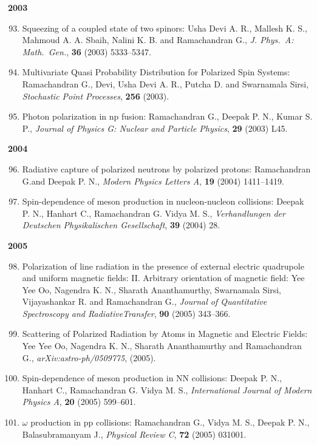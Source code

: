 \textbf{2003}
\begin{enumerate}
\setcounter{enumi}{92}
\item Squeezing of a coupled state of two spinors: Usha Devi A. R., Mallesh K. S., Mahmoud A. A. Sbaih, Nalini K. B. and Ramachandran G., \textit{J. Phys.\ A: Math.\ Gen.}, {\bf 36} (2003) 5333--5347.
\item Multivariate Quasi Probability Distribution for Polarized Spin Systems: Ramachandran G., Devi, Usha Devi A. R., Putcha D. and Swarnamala Sirsi, \textit{Stochastic Point Processes}, {\bf 256} (2003).
\item Photon polarization in np fusion: Ramachandran G., Deepak P. N., Kumar S. P., \textit{Journal of Physics G: Nuclear and Particle Physics}, {\bf 29} (2003) L45.
\end{enumerate}
\textbf{2004}
\begin{enumerate}
\setcounter{enumi}{95}
\item Radiative capture of polarized neutrons by polarized protons: Ramachandran G.and Deepak P. N., \textit{Modern Physics Letters A}, {\bf 19} (2004) 1411--1419.
\item Spin-dependence of meson production in nucleon-nucleon collisions: Deepak P. N., Hanhart C., Ramachandran G. Vidya M. S., \textit{Verhandlungen der Deutschen Physikalischen Gesellschaft}, {\bf 39} (2004) 28.
\end{enumerate}
\textbf{2005}
\begin{enumerate}
\setcounter{enumi}{97}
\item Polarization of line radiation in the presence of external electric quadrupole and uniform magnetic fields: II. Arbitrary orientation of magnetic field: Yee Yee Oo, Nagendra K. N., Sharath Ananthamurthy, Swarnamala Sirsi, Vijayashankar R. and Ramachandran G., \textit{Journal of Quantitative Spectroscopy and Radiative\break Transfer}, {\bf 90} (2005) 343--366.
\item Scattering of Polarized Radiation by Atoms in Magnetic and Electric Fields: Yee Yee Oo, Nagendra K. N., Sharath Ananthamurthy and Ramachandran G., \textit{arXiv:astro-ph/0509775}, (2005).
\item Spin-dependence of meson production in NN collisions: Deepak P. N., Hanhart C., Ramachandran G. Vidya M. S., \textit{International Journal of Modern Physics A}, {\bf 20} (2005) 599--601.
\item $\omega$ production in pp collisions: Ramachandran G., Vidya M. S., Deepak P. N., Balasubramanyam J., \textit{Physical Review C}, {\bf 72} (2005) 031001.
\end{enumerate}
